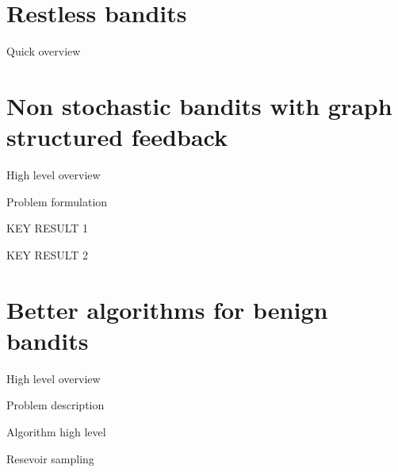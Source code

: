 \documentclass{beamer}
\begin{document}
\section{Restless bandits}

\begin{frame}{Quick overview}
\end{frame}

\section{Non stochastic bandits with graph structured feedback}
\begin{frame}{High level overview}

\end{frame} 

\begin{frame}{Problem formulation}

\end{frame}

\begin{frame}{KEY RESULT 1}
\end{frame}

\begin{frame}{KEY RESULT 2}

\end{frame}
\section{Better algorithms for benign bandits}
\begin{frame}{High level overview}
\end{frame}
\begin{frame}{Problem description}
\end{frame}
\begin{frame}{Algorithm high level}
\end{frame}
\begin{frame}{Resevoir sampling}
\end{frame}
\end{document}
